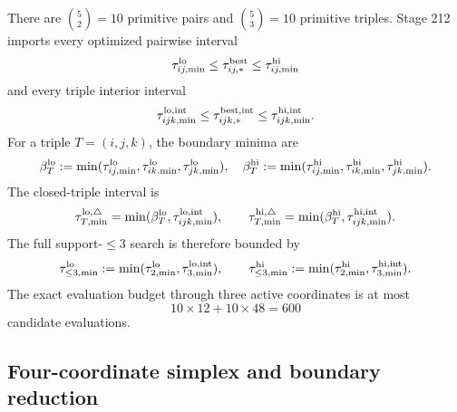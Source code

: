 There are \(\binom52=10\) primitive pairs and \(\binom53=10\) primitive triples.  Stage 212 imports every optimized pairwise interval
\begin{equation}
\label{eq:app-part06-pairwise-interval-import}
\tau_{ij,\min}^{\rm lo}\le\tau_{ij,*}^{\rm best}\le\tau_{ij,\min}^{\rm hi}
\end{equation}
and every triple interior interval
\begin{equation}
\label{eq:app-part06-triple-interior-interval-import}
\tau_{ijk,\min}^{\rm lo,int}\le\tau_{ijk,*}^{\rm best,int}\le\tau_{ijk,\min}^{\rm hi,int}.
\end{equation}
For a triple \(T=(i,j,k)\), the boundary minima are
\begin{equation}
\label{eq:app-part06-triple-boundary-minima}
\beta_T^{\rm lo}:=\min(\tau_{ij,\min}^{\rm lo},\tau_{ik,\min}^{\rm lo},\tau_{jk,\min}^{\rm lo}),
\quad
\beta_T^{\rm hi}:=\min(\tau_{ij,\min}^{\rm hi},\tau_{ik,\min}^{\rm hi},\tau_{jk,\min}^{\rm hi}).
\end{equation}
The closed-triple interval is
\begin{equation}
\label{eq:app-part06-triple-closed-interval}
\tau_{T,\min}^{\rm lo,\triangle}=\min(\beta_T^{\rm lo},\tau_{ijk,\min}^{\rm lo,int}),
\qquad
\tau_{T,\min}^{\rm hi,\triangle}=\min(\beta_T^{\rm hi},\tau_{ijk,\min}^{\rm hi,int}).
\end{equation}
The full support-\(\le3\) search is therefore bounded by
\begin{equation}
\label{eq:app-part06-support-le3-interval}
\tau_{\le3,\min}^{\rm lo}:=\min(\tau_{2,\min}^{\rm lo},\tau_{3,\min}^{\rm lo,int}),
\qquad
\tau_{\le3,\min}^{\rm hi}:=\min(\tau_{2,\min}^{\rm hi},\tau_{3,\min}^{\rm hi,int}).
\end{equation}
The exact evaluation budget through three active coordinates is at most
\begin{equation}
\label{eq:app-part06-budget-le3}
10\times12+10\times48=600
\end{equation}
candidate evaluations.

\subsection{Four-coordinate simplex and boundary reduction}
\label{subsec:app-part06-four-simplex-boundary-reduction}

